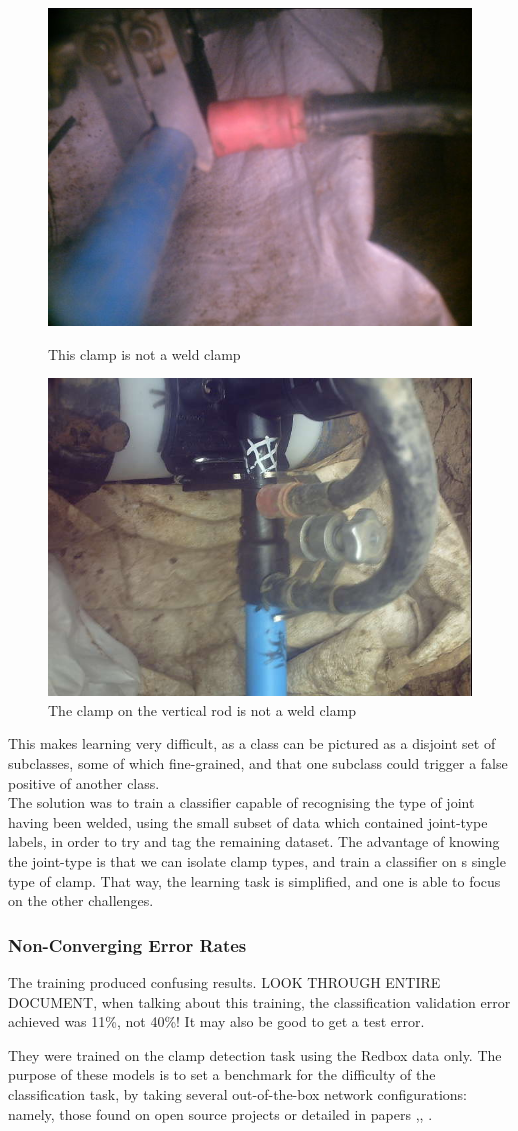 \documentclass[a4paper,11pt]{article}
\begin{document}
\begin{figure}[h!]
	\centering
	\includegraphics[width=0.35\linewidth]{images/truly_confusing_1.jpg}
	\caption{This clamp is not a weld clamp}
	\includegraphics[width=0.35\linewidth]{images/truly_confusing_2.jpg}
	\caption{The clamp on the vertical rod is not a weld clamp}
\end{figure}

This makes learning very difficult, as a class can be pictured as a disjoint set of subclasses, some of which fine-grained, and that one subclass could trigger a false positive of another class.\\

The solution was to train a classifier capable of recognising the type of joint having been welded, using the small subset of data which contained joint-type labels, in order to try and tag the remaining dataset. The advantage of knowing the joint-type is that we can isolate clamp types, and train a classifier on s single type of clamp. That way, the learning task is simplified, and one is able to focus on the other challenges. \\


\subsubsection{Non-Converging Error Rates}

The training produced confusing results. LOOK THROUGH ENTIRE DOCUMENT, when talking about this training, the classification validation error achieved was 11\%, not 40\%! It may also be good to get a test error.

They were trained on the clamp detection task using the Redbox data only. The purpose of these models is to set a benchmark for the difficulty of the classification task, by taking several out-of-the-box network configurations: namely, those found on open source projects or detailed in papers \cite{krizhevsky},\cite{transfer-learning}, \cite{decaf}. \\
\end{document}
